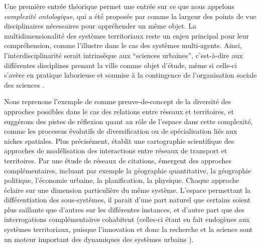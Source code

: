 \documentclass[11pt]{article}
\begin{document}
Une première entrée théorique permet une entrée sur ce que nous appelons \emph{complexité ontologique}, qui a été proposée par \cite{pumain2003approche} comme la largeur des points de vue disciplinaires nécessaires pour appréhender un même objet. La multidimensionalité des systèmes territoriaux reste un enjeu principal pour leur compréhension, comme l'illustre \cite{perez2016agent} dans le cas des systèmes multi-agents. Ainsi, l'interdisciplinarité serait intrinsèque aux ``sciences urbaines'', c'est-à-dire aux différentes disciplines prenant la ville comme objet d'étude, même si celle-ci s'avère en pratique laborieuse et soumise à la contingence de l'organisation sociale des sciences \citep{dupuy2015sciences}.


Nous reprenons l'exemple de \cite{raimbault2017invisible} comme preuve-de-concept de la diversité des approches possibles dans le cas des relations entre réseaux et territoires, et suggérons des pistes de réflexion quant au rôle de l'espace dans cette complexité, comme les processus évolutifs de diversification ou de spécialisation liés aux niches spatiales. Plus précisément, \cite{raimbault2017invisible} établit une cartographie scientifique des approches de modélisation des interactions entre réseaux de transport et territoires. Par une étude de réseaux de citations, émergent des approches complémentaires, incluant par exemple la géographie quantitative, la géographie politique, l'économie urbaine, la planification, la physique. Chaque approche éclaire sur une dimension particulière du même système. L'espace permettant la différentiation des sous-systèmes, il parait d'une part naturel que certains soient plus saillants que d'autres sur les différentes instances, et d'autre part que des interrogations complémentaires cohabitent (celles-ci étant en fait endogènes aux systèmes territoriaux, puisque l'innovation et donc la recherche et la science sont un moteur important des dynamiques des systèmes urbains \citep{pumain2010theorie}).




\end{document}
